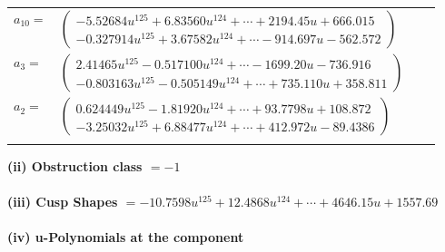 \documentclass[1p]{elsarticle_modified}
\theoremstyle{definition}
\begin{document}
\begin{tabular}{m{7pt} m{180pt} m{7pt} m{180pt} }
\flushright $a_{10}=$&$\begin{pmatrix}-5.52684 u^{125}+6.83560 u^{124}+\cdots+2194.45 u+666.015\\-0.327914 u^{125}+3.67582 u^{124}+\cdots-914.697 u-562.572\end{pmatrix}$ \\
\flushright $a_{3}=$&$\begin{pmatrix}2.41465 u^{125}-0.517100 u^{124}+\cdots-1699.20 u-736.916\\-0.803163 u^{125}-0.505149 u^{124}+\cdots+735.110 u+358.811\end{pmatrix}$ \\
\flushright $a_{2}=$&$\begin{pmatrix}0.624449 u^{125}-1.81920 u^{124}+\cdots+93.7798 u+108.872\\-3.25032 u^{125}+6.88477 u^{124}+\cdots+412.972 u-89.4386\end{pmatrix}$\\&\end{tabular}
\flushleft \textbf{(ii) Obstruction class $= -1$}\\~\\
\flushleft \textbf{(iii) Cusp Shapes $= -10.7598 u^{125}+12.4868 u^{124}+\cdots+4646.15 u+1557.69$}\\~\\
\newpage\renewcommand{\arraystretch}{1}
\flushleft \textbf{(iv) u-Polynomials at the component}\newline \\
\end{document}
